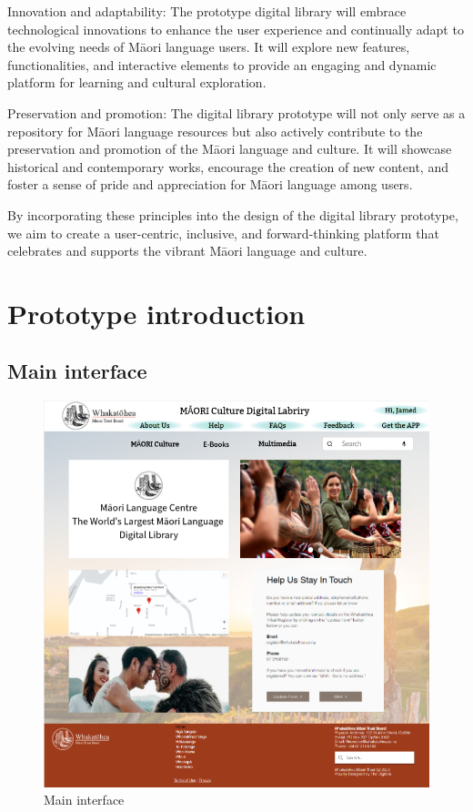 Innovation and adaptability: The prototype digital library will embrace technological innovations to enhance the user experience and continually adapt to the evolving needs of Māori language users. It will explore new features, functionalities, and interactive elements to provide an engaging and dynamic platform for learning and cultural exploration.

Preservation and promotion: The digital library prototype will not only serve as a repository for Māori language resources but also actively contribute to the preservation and promotion of the Māori language and culture. It will showcase historical and contemporary works, encourage the creation of new content, and foster a sense of pride and appreciation for Māori language among users.

By incorporating these principles into the design of the digital library prototype, we aim to create a user-centric, inclusive, and forward-thinking platform that celebrates and supports the vibrant Māori language and culture.

\section{Prototype introduction}

\subsection{Main interface}

\begin{figure}[htbp]
  \centerline{\includegraphics[width=400pt]{images/3-1-1.png}}
  \caption{Main interface}
  \label{fig30}
\end{figure}

